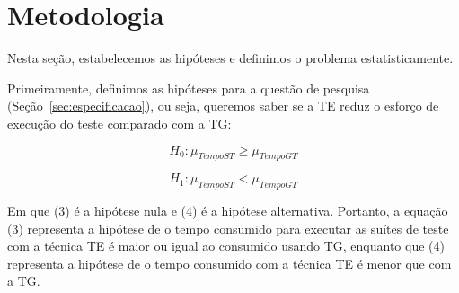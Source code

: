 \section{Metodologia}
\label{sec:metodologia}


Nesta seção, estabelecemos as hipóteses e definimos o problema estatisticamente.

Primeiramente, definimos as hipóteses para a questão de pesquisa (Seção~\ref{sec:especificacao}), ou seja, queremos saber se a TE reduz o esforço de execução do teste comparado com a TG:

\footnotesize
\begin{equation}
	H_{0} : \mu_{TempoST} \geq \mu_{TempoGT}
\end{equation}

\begin{equation}
	H_{1} : \mu_{TempoST} < \mu_{TempoGT}
\end{equation}
\normalsize

Em que (3) é a hipótese nula e (4) é a hipótese alternativa. Portanto, a equação (3) representa a hipótese de o tempo consumido para executar as suítes de teste com a técnica TE é maior ou igual ao consumido usando TG, enquanto que (4) representa a hipótese de o tempo consumido com a técnica TE é menor que com a TG.





